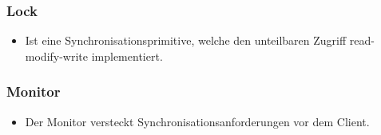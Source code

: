 \subsubsection{Lock}
  \begin{itemize}
  \item Ist eine Synchronisationsprimitive, welche den unteilbaren Zugriff read-modify-write
  implementiert.
  \end{itemize}
\subsubsection{Monitor}
  \begin{itemize}
  \item Der Monitor versteckt Synchronisationsanforderungen vor dem Client.
  \end{itemize}

